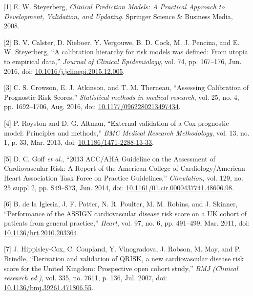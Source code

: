 \documentclass[
]{article}
\newenvironment{cslreferences}%
  {}%
  {\par}
\begin{document}
\hypertarget{refs}{}
\begin{cslreferences}
\leavevmode\hypertarget{ref-steyerberg_clinical_2008}{}%
{[}1{]} E. W. Steyerberg, \emph{Clinical Prediction Models: A Practical Approach to Development, Validation, and Updating}. Springer Science \& Business Media, 2008.

\leavevmode\hypertarget{ref-calster_calibration_2016-1}{}%
{[}2{]} B. V. Calster, D. Nieboer, Y. Vergouwe, B. D. Cock, M. J. Pencina, and E. W. Steyerberg, ``A calibration hierarchy for risk models was defined: From utopia to empirical data,'' \emph{Journal of Clinical Epidemiology}, vol. 74, pp. 167--176, Jun. 2016, doi: \href{https://doi.org/10.1016/j.jclinepi.2015.12.005}{10.1016/j.jclinepi.2015.12.005}.

\leavevmode\hypertarget{ref-crowson_assessing_2016}{}%
{[}3{]} C. S. Crowson, E. J. Atkinson, and T. M. Therneau, ``Assessing Calibration of Prognostic Risk Scores,'' \emph{Statistical methods in medical research}, vol. 25, no. 4, pp. 1692--1706, Aug. 2016, doi: \href{https://doi.org/10.1177/0962280213497434}{10.1177/0962280213497434}.

\leavevmode\hypertarget{ref-royston_external_2013}{}%
{[}4{]} P. Royston and D. G. Altman, ``External validation of a Cox prognostic model: Principles and methods,'' \emph{BMC Medical Research Methodology}, vol. 13, no. 1, p. 33, Mar. 2013, doi: \href{https://doi.org/10.1186/1471-2288-13-33}{10.1186/1471-2288-13-33}.

\leavevmode\hypertarget{ref-goff_2013_2014}{}%
{[}5{]} D. C. Goff \emph{et al.}, ``2013 ACC/AHA Guideline on the Assessment of Cardiovascular Risk: A Report of the American College of Cardiology/American Heart Association Task Force on Practice Guidelines,'' \emph{Circulation}, vol. 129, no. 25 suppl 2, pp. S49--S73, Jun. 2014, doi: \href{https://doi.org/10.1161/01.cir.0000437741.48606.98}{10.1161/01.cir.0000437741.48606.98}.

\leavevmode\hypertarget{ref-de_la_iglesia_performance_2011}{}%
{[}6{]} B. de la Iglesia, J. F. Potter, N. R. Poulter, M. M. Robins, and J. Skinner, ``Performance of the ASSIGN cardiovascular disease risk score on a UK cohort of patients from general practice,'' \emph{Heart}, vol. 97, no. 6, pp. 491--499, Mar. 2011, doi: \href{https://doi.org/10.1136/hrt.2010.203364}{10.1136/hrt.2010.203364}.

\leavevmode\hypertarget{ref-hippisley-cox_derivation_2007}{}%
{[}7{]} J. Hippisley-Cox, C. Coupland, Y. Vinogradova, J. Robson, M. May, and P. Brindle, ``Derivation and validation of QRISK, a new cardiovascular disease risk score for the United Kingdom: Prospective open cohort study,'' \emph{BMJ (Clinical research ed.)}, vol. 335, no. 7611, p. 136, Jul. 2007, doi: \href{https://doi.org/10.1136/bmj.39261.471806.55}{10.1136/bmj.39261.471806.55}.


\end{cslreferences}
\end{document}
